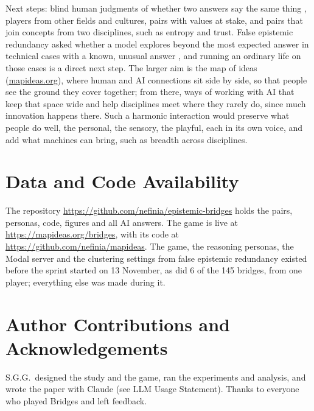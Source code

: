 \documentclass[11pt]{article}
\begin{document}
Next steps: blind human judgments of whether two answers say the same thing \citep{tevet2021,zhang2025}, players from other fields and cultures, pairs with values at stake, and pairs that join concepts from two disciplines, such as entropy and trust. False epistemic redundancy asked whether a model explores beyond the most expected answer in technical cases with a known, unusual answer \citep{gallego2026fer}, and running an ordinary life on those cases is a direct next step. The larger aim is the map of ideas (\href{https://mapideas.org}{mapideas.org}), where human and AI connections sit side by side, so that people see the ground they cover together; from there, ways of working with AI that keep that space wide and help disciplines meet where they rarely do, since much innovation happens there. Such a harmonic interaction would preserve what people do well, the personal, the sensory, the playful, each in its own voice, and add what machines can bring, such as breadth across disciplines.

\section*{Data and Code Availability}
The repository \url{https://github.com/nefinia/epistemic-bridges} holds the pairs, personas, code, figures and all AI answers. The game is live at \url{https://mapideas.org/bridges}, with its code at \url{https://github.com/nefinia/mapideas}. The game, the reasoning personas, the Modal server and the clustering settings from false epistemic redundancy existed before the sprint started on 13 November, as did 6 of the 145 bridges, from one player; everything else was made during it.

\section*{Author Contributions and Acknowledgements}
S.G.G.\ designed the study and the game, ran the experiments and analysis, and wrote the paper with Claude (see LLM Usage Statement). Thanks to everyone who played Bridges and left feedback.
\end{document}

